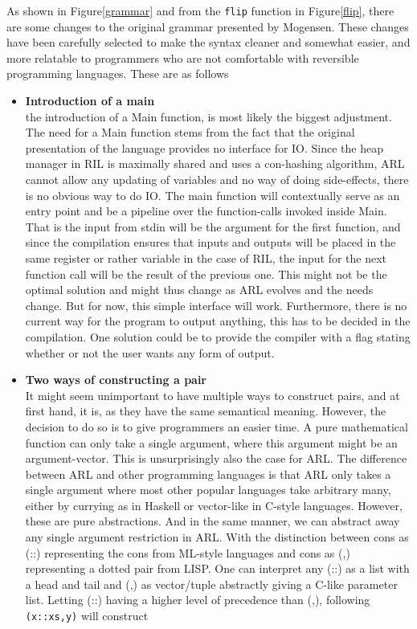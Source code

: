 \documentclass[a4paper]{article}
\begin{document}
As shown in Figure\ref{grammar} and from the \texttt{flip} function in Figure\ref{flip}, there are some changes to the original grammar presented by Mogensen. These changes have been carefully selected to make the syntax cleaner and somewhat easier, and more relatable to programmers who are not comfortable with reversible programming languages. These are as follows
\begin{itemize}
\item \textbf{Introduction of a main}\\
the introduction of a Main function, is most likely the biggest adjustment. The need for a Main function stems from the fact that the original presentation of the language provides no interface for IO. Since the heap manager in RIL is maximally shared and uses a con-hashing algorithm, ARL cannot allow any updating of variables and no way of doing side-effects, there is no obvious way to do IO. The main function will contextually serve as an entry point and be a pipeline over the function-calls invoked inside Main. That is the input from stdin will be the argument for the first function, and since the compilation ensures that inputs and outputs will be placed in the same register or rather variable in the case of RIL, the input for the next function call will be the result of the previous one. This might not be the optimal solution and might thus change as ARL evolves and the needs change. But for now, this simple interface will work. Furthermore, there is no current way for the program to output anything, this has to be decided in the compilation. One solution could be to provide the compiler with a flag stating whether or not the user wants any form of output.
\item \textbf{Two ways of constructing a pair}\\
It might seem unimportant to have multiple ways to construct pairs, and at first hand, it is, as they have the same semantical meaning. However, the decision to do so is to give programmers an easier time. A pure mathematical function can only take a single argument, where this argument might be an argument-vector. This is unsurprisingly also the case for ARL. The difference between ARL and other programming languages is that ARL only takes a single argument where most other popular languages take arbitrary many, either by currying as in Haskell or vector-like in C-style languages. However, these are pure abstractions. And in the same manner, we can abstract away any single argument restriction in ARL. With the distinction between cons as (::) representing the cons from ML-style languages and cons as (,) representing a dotted pair from LISP. One can interpret any (::) as a list with a head and tail and (,) as vector/tuple abstractly giving a C-like parameter list. Letting (::) having a higher level of precedence than (,), following \verb+(x::xs,y)+ will construct


\end{itemize}
\end{document}
